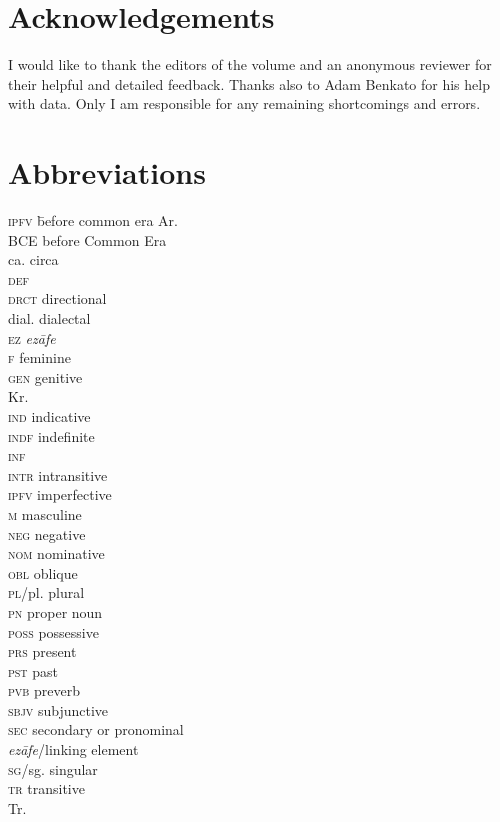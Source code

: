 \documentclass[output=paper]{langsci/langscibook}
\begin{document}
\section*{Acknowledgements}
I would like to thank the editors of the volume and an anonymous reviewer for their helpful and detailed feedback. Thanks also to Adam Benkato for his help with  data. Only I am responsible for any remaining shortcomings and errors. 

\section*{Abbreviations}
\begin{multicols}{2}
\begin{tabbing}
\textsc{ipfv} \hspace{1em} \= before common era\kill
Ar.              \> \\
BCE             \> before Common Era\\
ca.             \> circa\\
\textsc{def}    \>  \\
\textsc{drct}   \> directional\\
dial.           \> dialectal \\
\textsc{ez}     \> \textit{ezāfe} \\
\textsc{f}      \> feminine \\
\textsc{gen}    \> genitive\\
Kr.             \> \\
\textsc{ind}    \> indicative \\
\textsc{indf}   \> indefinite \\
\textsc{inf}    \> \\
\textsc{intr}   \> intransitive\\
\textsc{ipfv}   \> imperfective \\
\textsc{m}      \> masculine \\
\textsc{neg}    \> negative\\
\textsc{nom}    \> nominative\\
\textsc{obl}    \> oblique\\
\textsc{pl/}pl. \> plural \\
\textsc{pn}     \> proper noun\\
\textsc{poss}   \> possessive \\
\textsc{prs}    \> present \\
\textsc{pst}    \> past \\
\textsc{pvb}    \> preverb\\
\textsc{sbjv}   \> subjunctive \\
\textsc{sec}    \> secondary or pronominal \\ \> \textit{ezāfe}/linking element\\
\textsc{sg/}sg. \> singular\\
\textsc{tr}     \> transitive\\
Tr.             \> 
\end{tabbing}
\end{multicols}


{\sloppy\printbibliography[heading=subbibliography,notkeyword=this]}
\end{document}
